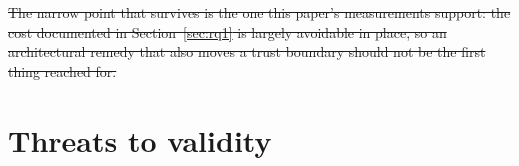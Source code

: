 \documentclass[pdflatex,sn-basic,twocolumn]{sn-jnl}%
\providecommand{\DIFadd}[1]{{\protect\color{blue}\uwave{#1}}} %
\providecommand{\DIFdel}[1]{{\protect\color{red}\sout{#1}}}                      %
\providecommand{\DIFaddbegin}{} %
\providecommand{\DIFaddend}{} %
\providecommand{\DIFdelbegin}{} %
\providecommand{\DIFdelend}{} %
\newcommand{\DIFscaledelfig}{0.5}
\newlength{\DIFdelgraphicswidth} %
\newlength{\DIFdelgraphicsheight} %
\newcommand{\DIFaddincludegraphics}[2][]{{\color{blue}\fbox{\DIFOincludegraphics[#1]{#2}}}} %
\newcommand{\DIFdelincludegraphics}[2][]{%
\sbox{\DIFdelgraphicsbox}{\DIFOincludegraphics[#1]{#2}}%
\settoboxwidth{\DIFdelgraphicswidth}{\DIFdelgraphicsbox} %
\settoboxtotalheight{\DIFdelgraphicsheight}{\DIFdelgraphicsbox} %
\scalebox{\DIFscaledelfig}{%
\parbox[b]{\DIFdelgraphicswidth}{\usebox{\DIFdelgraphicsbox}\\[-\baselineskip] \rule{\DIFdelgraphicswidth}{0em}}\llap{\resizebox{\DIFdelgraphicswidth}{\DIFdelgraphicsheight}{%
\setlength{\unitlength}{\DIFdelgraphicswidth}%
\begin{picture}(1,1)%
\thicklines\linethickness{2pt} %
{\color[rgb]{1,0,0}\put(0,0){\framebox(1,1){}}}%
{\color[rgb]{1,0,0}\put(0,0){\line( 1,1){1}}}%
{\color[rgb]{1,0,0}\put(0,1){\line(1,-1){1}}}%
\end{picture}%
}\hspace*{3pt}}} %
} %
\DeclareRobustCommand{\DIFaddbegin}{\DIFOaddbegin \let\includegraphics\DIFaddincludegraphics} %
\DeclareRobustCommand{\DIFaddend}{\DIFOaddend \let\includegraphics\DIFOincludegraphics} %
\DeclareRobustCommand{\DIFdelbegin}{\DIFOdelbegin \let\includegraphics\DIFdelincludegraphics} %
\DeclareRobustCommand{\DIFdelend}{\DIFOaddend \let\includegraphics\DIFOincludegraphics} %
\begin{document}
\DIFdel{The narrow point that survives is the one this paper's measurements support: the cost documented in Section~\ref{sec:rq1} is largely avoidable in place, so an
architectural remedy that also moves a trust boundary should not be the
first
thing reached for.
}\DIFdelend \DIFaddbegin \DIFadd{~}\citep{artifact2026}\DIFadd{.
}\DIFaddend 

\section{Threats to validity}\label{sec:threats}

\DIFdelbegin %
\end{document}
